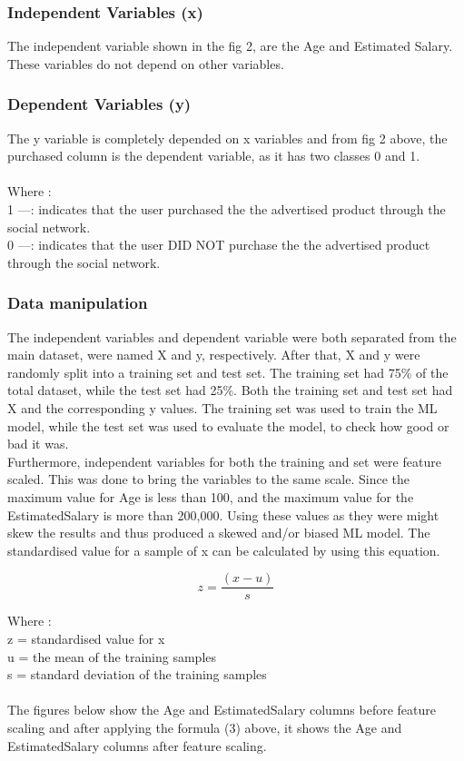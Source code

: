 \documentclass[conference]{IEEEtran}
\begin{document}
\subsubsection{Independent Variables (x)}
The independent variable shown in the fig 2, are the Age and Estimated Salary. These variables do not depend on other variables.

\subsubsection{Dependent Variables (y)}
The y variable is completely depended on x variables and from fig 2 above, the purchased column is the dependent variable, as it has two classes 0 and 1.\\
\\
Where :\\
1 —: indicates that the user purchased the the advertised product through the social network.\\
0 —: indicates that the user DID NOT purchase the the advertised product through the social network.\\

\subsubsection{Data manipulation}
The independent variables and dependent variable were both separated from the main dataset, were named X and y, respectively.
After that, X and y were randomly split into a training set and test set. The training set had 75\% of the total dataset, while the test set had 25\%. Both the training set and test set had X and the corresponding y values.
The training set was used to train the ML model, while the test set was used to evaluate the model, to check how good or bad it was.\\
Furthermore, independent variables for both the training and set were feature scaled. This was done to bring the variables to the same scale. Since the maximum value for Age is less than 100, and the maximum value for the EstimatedSalary is more than 200,000. Using these values as they were might skew the results and thus produced a skewed and/or biased ML model. The standardised value for a sample of x can be calculated by using this equation.

\begin{equation} 
\label{equ3}
z = \frac{(x-u)}{s}
\end{equation} 

Where :\\
z = standardised value for x\\
u = the mean of the training samples\\
s = standard deviation of the training samples\\
\\
The figures below show the Age and EstimatedSalary columns before feature scaling and after applying the formula (3) above, it shows the Age and EstimatedSalary columns after feature scaling.
\end{document}
